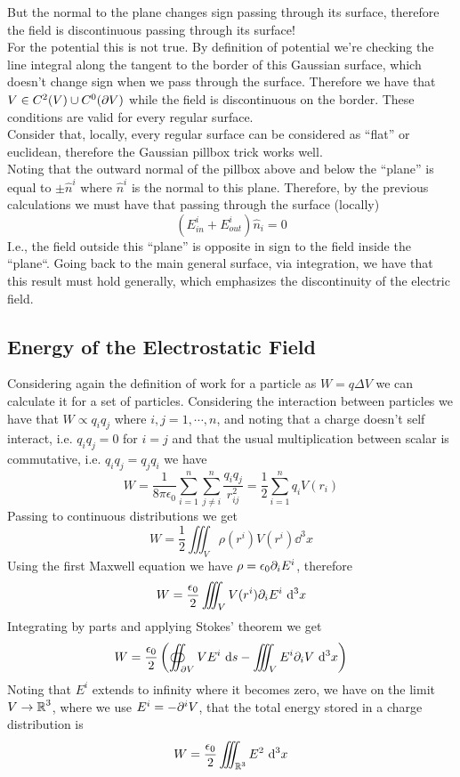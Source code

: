 \documentclass[../electromagnetism]{subfiles}
\begin{document}
But the normal to the plane changes sign passing through its surface, therefore the field is discontinuous passing through its surface!\\
For the potential this is not true. By definition of potential we're checking the line integral along the tangent to the border of this Gaussian surface, which doesn't change sign when we pass through the surface. Therefore we have that $V\in C^2(V)\cup C^0(\partial V)$ while the field is discontinuous on the border. These conditions are valid for every regular surface.\\
Consider that, locally, every regular surface can be considered as ``flat'' or euclidean, therefore the Gaussian pillbox trick works well.\\
Noting that the outward normal of the pillbox above and below the ``plane'' is equal to $\pm\hat{n}^i$ where $\hat{n}^i$ is the normal to this plane. Therefore, by the previous calculations we must have that passing through the surface (locally)
\begin{equation}
	\left( E^i_{in}+E^i_{out} \right)\hat{n}_i=0
	\label{eq:efieldboundarycond}
\end{equation}
I.e., the field outside this ``plane'' is opposite in sign to the field inside the ``plane``. Going back to the main general surface, via integration, we have that this result must hold generally, which emphasizes the discontinuity of the electric field.
\subsection{Energy of the Electrostatic Field}
Considering again the definition of work for a particle as $W=q\Delta V$ we can calculate it for a set of particles. Considering the interaction between particles we have that $W\propto q_iq_j$ where $i,j=1,\cdots,n$, and noting that a charge doesn't self interact, i.e. $q_iq_j=0$ for $i=j$ and that the usual multiplication between scalar is commutative, i.e. $q_iq_j=q_jq_i$ we have
\begin{equation}
	W=\frac{1}{8\pi\epsilon_0}\sum_{i=1}^n\sum_{j\ne i}^n\frac{q_iq_j}{r_{ij}^2}=\frac{1}{2}\sum_{i=1}^nq_iV(r_i)
	\label{eq:ensyspart}
\end{equation}
Passing to continuous distributions we get
\begin{equation*}
	W=\frac{1}{2}\iiint_V\rho(r^i)V(r^i)\dd^3x
\end{equation*}
Using the first Maxwell equation we have $\rho=\epsilon_0\partial_iE^i$, therefore
\begin{equation*}
	W=\frac{\epsilon_0}{2}\iiint_VV({r}^i)\partial_iE^i\ \mathrm{d}^3x
\end{equation*}
Integrating by parts and applying Stokes' theorem we get
\begin{equation}
	W=\frac{\epsilon_0}{2}\left( \oiint_{\partial V}VE^i\ \mathrm{d} s-\iiint_VE^i\partial_i V\ \mathrm{d}^3x \right)
	\label{eq:energyvolume}
\end{equation}
Noting that $E^i$ extends to infinity where it becomes zero, we have on the limit $V\to\operatorname{\mathbb{R}}^3$, where we use $E^i=-\partial^i V$, that the total energy stored in a charge distribution is
\begin{equation}
	W=\frac{\epsilon_0}{2}\iiint_{\operatorname{\mathbb{R}}^3}E^2\ \mathrm{d}^3x
	\label{eq:totalenergy}
\end{equation}
\end{document}
